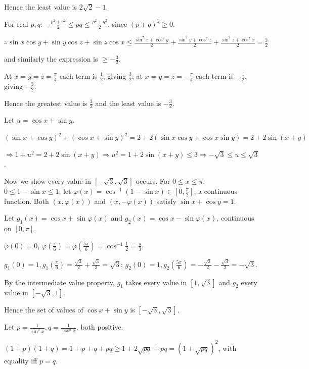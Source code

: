   Hence the least value is $2\sqrt{2} - 1$.
\item For real $p, q$: $-\frac{p^2 + q^2}{2}\le pq\le\frac{p^2 + q^2}{2}$, since $(p\mp q)^2\ge 0$.

  $\therefore\sin x\cos y + \sin y\cos z + \sin z\cos x\le\frac{\sin^2x + \cos^2y}{2} + \frac{\sin^2y + \cos^2z}{2} +
  \frac{\sin^2z + \cos^2x}{2} = \frac{3}{2}$

  and similarly the expression is $\ge -\frac{3}{2}$.

  At $x = y = z = \frac{\pi}{4}$ each term is $\frac{1}{2}$, giving $\frac{3}{2}$; at $x = y = z = -\frac{\pi}{4}$
  each term is $-\frac{1}{2}$, giving $-\frac{3}{2}$.

  Hence the greatest value is $\frac{3}{2}$ and the least value is $-\frac{3}{2}$.
\item Let $u = \cos x + \sin y$.

  $(\sin x + \cos y)^2 + (\cos x + \sin y)^2 = 2 + 2(\sin x\cos y + \cos x\sin y) = 2 + 2\sin(x + y)$

  $\Rightarrow 1 + u^2 = 2 + 2\sin(x + y)\Rightarrow u^2 = 1 + 2\sin(x + y)\le 3\Rightarrow -\sqrt{3}\le
  u\le\sqrt{3}$.

  Now we show every value in $\left[-\sqrt{3}, \sqrt{3}\right]$ occurs. For $0\le x\le\pi$, $0\le 1 - \sin x\le 1$; let
  $\varphi(x) = \cos^{-1}(1 - \sin x)\in\left[0, \frac{\pi}{2}\right]$, a continuous function. Both $(x, \varphi(x))$
  and $(x, -\varphi(x))$ satisfy $\sin x + \cos y = 1$.

  Let $g_1(x) = \cos x + \sin\varphi(x)$ and $g_2(x) = \cos x - \sin\varphi(x)$, continuous on $[0, \pi]$.

  $\varphi(0) = 0$, $\varphi\left(\frac{\pi}{6}\right) = \varphi\left(\frac{5\pi}{6}\right) = \cos^{-1}\frac{1}{2} =
  \frac{\pi}{3}$.

  $g_1(0) = 1, g_1\left(\frac{\pi}{6}\right) = \frac{\sqrt{3}}{2} + \frac{\sqrt{3}}{2} = \sqrt{3}$; $g_2(0) = 1,
  g_2\left(\frac{5\pi}{6}\right) = -\frac{\sqrt{3}}{2} - \frac{\sqrt{3}}{2} = -\sqrt{3}$.

  By the intermediate value property, $g_1$ takes every value in $\left[1, \sqrt{3}\right]$ and $g_2$ every value in
  $\left[-\sqrt{3}, 1\right]$.

  Hence the set of values of $\cos x + \sin y$ is $\left[-\sqrt{3}, \sqrt{3}\right]$.
\item Let $p = \frac{1}{\sin^nx}, q = \frac{1}{\cos^nx}$, both positive.

  $(1 + p)(1 + q) = 1 + p + q + pq\ge 1 + 2\sqrt{pq} + pq = \left(1 + \sqrt{pq}\right)^2$, with equality iff $p = q$.

